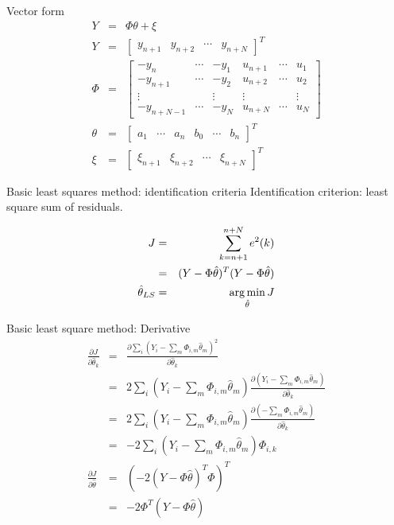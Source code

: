 \begin{frame}{ Vector form }
\begin{eqnarray*}
Y &=& \Phi \theta + \xi \\
Y &=& \begin{bmatrix}  y_{n+1} & y_{n+2} & \cdots & y_{n+N}  \end{bmatrix}^T  \\
\Phi &=& \begin{bmatrix}
-y_{n}    & \cdots & -y_{1}   & u_{n+1} & \cdots & u_{1}  \\
-y_{n+1}  & \cdots & -y_{2}   & u_{n+2} & \cdots & u_{2}  \\
\vdots   &        & \vdots  & \vdots &        & \vdots \\
-y_{n+N-1} & \cdots & -y_{N}   & u_{n+N} & \cdots & u_{N}
\end{bmatrix} \\
\theta &=& \begin{bmatrix}a_1 & \cdots & a_n & b_0 & \cdots & b_n \end{bmatrix}^T\\
\xi &=& \begin{bmatrix}  \xi_{n+1} &  \xi_{n+2} & \cdots & \xi_{n+N} \end{bmatrix}^T
\end{eqnarray*}
\end{frame}

\begin{frame}{ Basic least squares method: identification criteria }
Identification criterion: least square sum of residuals.

\begin{eqnarray*}
J &=& \sum_{k=n+1}^{n+N}e^2(k)  \\
&=& (Y-\Phi\hat\theta)^T(Y-\Phi\hat\theta) \\
\hat\theta_{LS} &=& \operatorname*{arg\,min}_{\hat\theta} J
\end{eqnarray*}
\end{frame}

\begin{frame}{ Basic least square method: Derivative }
\begin{eqnarray*}
\frac{\partial J}{\partial \hat\theta_k} &=& \frac{\partial \sum_i(Y_i-\sum_m\Phi_{i,m}\hat\theta_m)^2}{\partial\hat\theta_k}  \\
&=& 2\sum_i(Y_i-\sum_m\Phi_{i,m}\hat\theta_m)\frac{\partial (Y_i-\sum_m\Phi_{i,m}\hat\theta_m)}{\partial\hat\theta_k} \\
&=& 2\sum_i(Y_i-\sum_m\Phi_{i,m}\hat\theta_m)\frac{\partial(-\sum_m\Phi_{i,m}\hat\theta_m)}{\partial\hat\theta_k} \\
&=& -2\sum_i(Y_i-\sum_m\Phi_{i,m}\hat\theta_m)\Phi_{i,k} \\
\frac{\partial J}{\partial \hat\theta}&=& (-2(Y-\Phi\hat\theta)^T\Phi)^T \\
&=& -2\Phi^T(Y-\Phi\hat\theta) 
\end{eqnarray*}
\end{frame}


